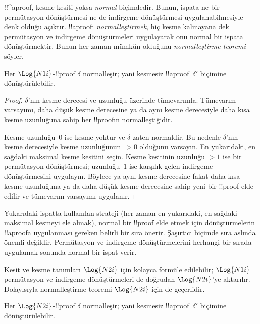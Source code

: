 



!!^a{proof}, kesme kesiti yoksa \emph{normal} biçimdedir. Bunun, ispata ne
bir permütasyon dönüştürmesi ne de indirgeme dönüştürmesi uygulanabilmesiyle
denk olduğu açıktır. !!a{proof}{}ı \emph{normalleştirmek}, hiç kesme kalmayana
dek permütasyon ve indirgeme dönüştürmeleri uygulayarak onu normal bir ispata
dönüştürmektir. Bunun her zaman mümkün olduğunu \emph{normalleştirme teoremi}
söyler.

\begin{thm} Her $\Log{N1i}$-!!{proof}
$\delta$ normalleşir; yani kesmesiz !!a{proof}~$\delta'$ biçimine
dönüştürülebilir.
\end{thm}

\begin{proof}
  $\delta$'nın kesme derecesi ve uzunluğu üzerinde tümevarımla. Tümevarım
  varsayımı, daha düşük kesme derecesine ya da aynı kesme derecesiyle daha
kısa kesme uzunluğuna sahip her !!{proof}{}ın normalleştiğidir.

  Kesme uzunluğu~$0$ ise kesme yoktur ve $\delta$ zaten normaldir. Bu nedenle
  $\delta$'nın kesme derecesiyle kesme uzunluğunun~$>0$ olduğunu varsayın. En
  yukarıdaki, en sağdaki maksimal kesme kesitini seçin. Kesme kesitinin
  uzunluğu $>1$ ise bir permütasyon dönüştürmesi; uzunluğu~$1$ ise karşılık
  gelen indirgeme dönüştürmesini uygulayın. Böylece ya aynı kesme derecesine
  fakat daha kısa kesme uzunluğuna ya da daha düşük kesme derecesine sahip
  yeni bir !!{proof} elde edilir ve tümevarım varsayımı uygulanır.
\end{proof}

Yukarıdaki ispatta kullanılan strateji (her zaman en yukarıdaki, en sağdaki
maksimal kesmeyi ele almak), normal bir !!{proof} elde etmek için
dönüştürmelerin !!a{proof}{}a uygulanması gereken belirli bir sıra önerir.
Şaşırtıcı biçimde sıra aslında önemli değildir. Permütasyon ve indirgeme
dönüştürmelerini herhangi bir sırada uygulamak sonunda normal bir ispat verir.

Kesit ve kesme tanımları $\Log{N2i}$ için kolayca formüle edilebilir;
$\Log{N1i}$ permütasyon ve indirgeme dönüştürmeleri de doğrudan $\Log{N2i}$'ye
aktarılır. Dolayısıyla normalleştirme teoremi $\Log{N2i}$ için de geçerlidir.

\begin{thm} Her $\Log{N2i}$-!!{proof}
$\delta$ normalleşir; yani kesmesiz !!a{proof}~$\delta'$ biçimine
dönüştürülebilir.
\end{thm}

